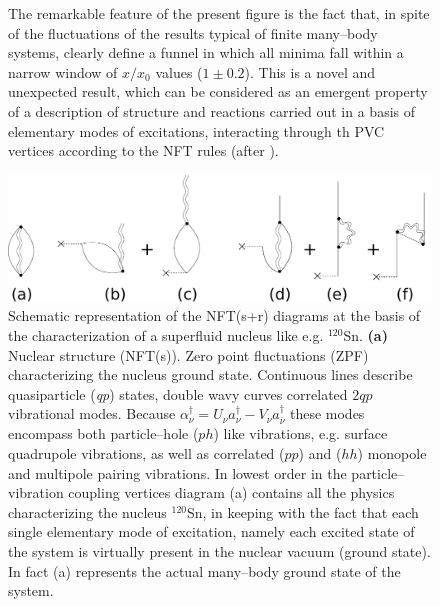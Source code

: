 \begin{figure}
\begin{center}
{The remarkable feature of the present figure is the fact that, in spite of the fluctuations of the results typical of finite  many--body systems, clearly define a funnel in which all minima fall within a narrow window of $x/x_0$ values ($1 \pm 0.2$). This is a novel and unexpected result, which can be considered as an emergent property of a description of structure and reactions carried out in a basis of elementary modes of excitations, interacting through th PVC vertices according to the NFT rules (after \cite{Broglia:16}).}\label{fig1.4.1x}
\end{center}
\end{figure}


\begin{figure}
\begin{center}
\includegraphics[width=\textwidth]{introduccion/figs/fig1_4_2.pdf}
\caption{Schematic representation of the NFT(s+r) diagrams at the basis of the characterization of a superfluid nucleus like e.g. $^{120}$Sn. \textbf{(a)} Nuclear structure (NFT(s)). Zero point fluctuations (ZPF) characterizing the nucleus ground state. Continuous lines describe quasiparticle (\textit{qp}) states, double wavy curves correlated $2qp$ vibrational modes. Because $\alpha^{\dagger}_{\nu}=U_\nu a^\dagger_\nu-V_\nu a^\dagger_{\bar{\nu}}$ these modes encompass both particle--hole ($ph$) like vibrations, e.g. surface quadrupole vibrations, as well as correlated ($pp$) and ($hh$) monopole and multipole pairing vibrations. In lowest order in the particle--vibration coupling vertices diagram (a) contains all the physics characterizing the nucleus $^{120}$Sn, in keeping with the fact that each single elementary mode of excitation, namely each excited state of the system is virtually present in the nuclear vacuum (ground state). In fact (a) represents the actual many--body ground state of the system.}\label{fig1.4.2}
\end{center}
\end{figure}

